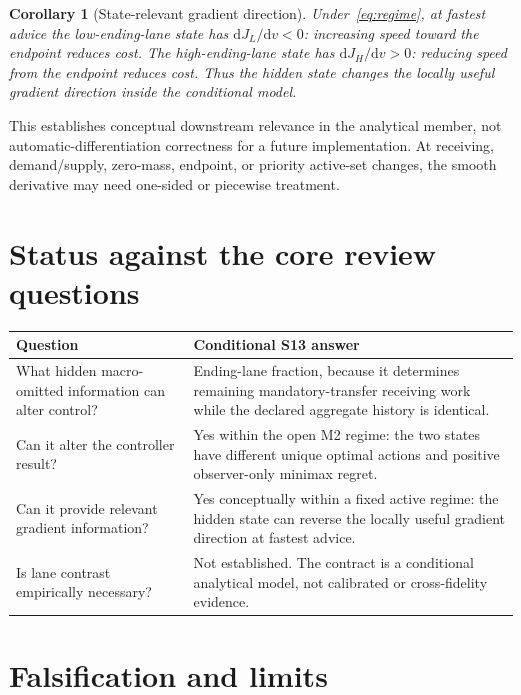 \documentclass[11pt]{article}
\newtheorem{corollary}{Corollary}
\newcommand{\dd}{\mathrm{d}}
\begin{document}
\begin{corollary}[State-relevant gradient direction]
Under~\eqref{eq:regime}, at fastest advice the low-ending-lane state has
\(\dd J_L/\dd v<0\): increasing speed toward the endpoint reduces cost. The
high-ending-lane state has \(\dd J_H/\dd v>0\): reducing speed from the endpoint
reduces cost. Thus the hidden state changes the locally useful gradient direction
inside the conditional model.
\end{corollary}

This establishes conceptual downstream relevance in the analytical member, not
automatic-differentiation correctness for a future implementation. At receiving,
demand/supply, zero-mass, endpoint, or priority active-set changes, the smooth
derivative may need one-sided or piecewise treatment.

\section{Status against the core review questions}

\begin{center}
\begin{tabular}{p{}p{}}
\toprule
Question & Conditional S13 answer \\
\midrule
What hidden macro-omitted information can alter control? & Ending-lane fraction,
because it determines remaining mandatory-transfer receiving work while the
declared aggregate history is identical. \\
Can it alter the controller result? & Yes within the open M2 regime: the two
states have different unique optimal actions and positive observer-only minimax
regret. \\
Can it provide relevant gradient information? & Yes conceptually within a fixed
active regime: the hidden state can reverse the locally useful gradient direction
at fastest advice. \\
Is lane contrast empirically necessary? & Not established. The contract is a
conditional analytical model, not calibrated or cross-fidelity evidence. \\
\bottomrule
\end{tabular}
\end{center}

\section{Falsification and limits}
\end{document}
